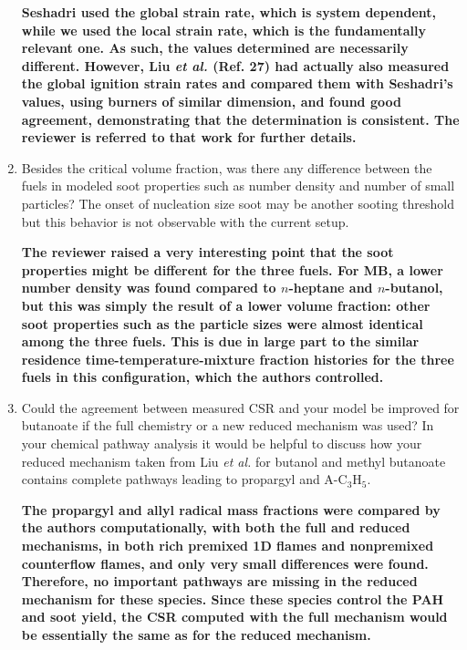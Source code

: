 \documentclass[10pt,letterpaper]{article}
\begin{document}
\begin{enumerate}
\textbf{Seshadri used the global strain rate, which is system dependent, while we used the local strain rate, which is the fundamentally relevant one. As such, the values determined are necessarily different. However, Liu \emph{et al.} (Ref. 27) had actually also measured the global ignition strain rates and compared them with Seshadri’s values, using burners of similar dimension, and found good agreement, demonstrating that the determination is consistent. The reviewer is referred to that work for further details. }

\item Besides the critical volume fraction, was there any difference between the fuels in modeled soot properties such as number density and number of small particles? The onset of nucleation size soot may be another sooting threshold but this behavior is not observable with the current setup.

\textbf{The reviewer raised a very interesting point that the soot properties might be different for the three fuels.  For MB, a lower number density was found compared to $n$-heptane and $n$-butanol, but this was simply the result of a lower volume fraction: other soot properties such as the particle sizes were almost identical among the three fuels.  This is due in large part to the similar residence time-temperature-mixture fraction histories for the three fuels in this configuration, which the authors controlled.}

\item Could the agreement between measured CSR and your model be improved for butanoate if the full chemistry or a new reduced mechanism was used?  In your chemical pathway analysis it would be helpful to discuss how your reduced mechanism taken from Liu \emph{et al.} for butanol and methyl butanoate contains complete pathways leading to propargyl and A-C$_3$H$_5$.

\textbf{The propargyl and allyl radical mass fractions were compared by the authors computationally, with both the full and reduced mechanisms, in both rich premixed 1D flames and nonpremixed counterflow flames, and only very small differences were found.  Therefore, no important pathways are missing in the reduced mechanism for these species.  Since these species control the PAH and soot yield, the CSR computed with the full mechanism would be essentially the same as for the reduced mechanism.}

\end{enumerate}
\end{document}
